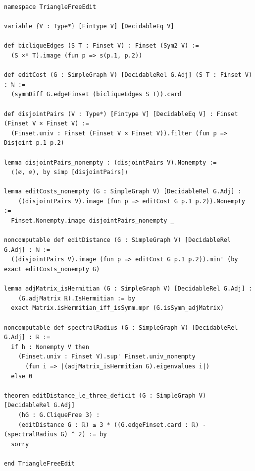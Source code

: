 \documentclass[11pt]{article}
\theoremstyle{remark}
\begin{document}
\begin{Verbatim}[fontsize=\small]
namespace TriangleFreeEdit

variable {V : Type*} [Fintype V] [DecidableEq V]

def bicliqueEdges (S T : Finset V) : Finset (Sym2 V) :=
  (S ×ˢ T).image (fun p => s(p.1, p.2))

def editCost (G : SimpleGraph V) [DecidableRel G.Adj] (S T : Finset V) : ℕ :=
  (symmDiff G.edgeFinset (bicliqueEdges S T)).card

def disjointPairs (V : Type*) [Fintype V] [DecidableEq V] : Finset (Finset V × Finset V) :=
  (Finset.univ : Finset (Finset V × Finset V)).filter (fun p => Disjoint p.1 p.2)

lemma disjointPairs_nonempty : (disjointPairs V).Nonempty :=
  ⟨(∅, ∅), by simp [disjointPairs]⟩

lemma editCosts_nonempty (G : SimpleGraph V) [DecidableRel G.Adj] :
    ((disjointPairs V).image (fun p => editCost G p.1 p.2)).Nonempty :=
  Finset.Nonempty.image disjointPairs_nonempty _

noncomputable def editDistance (G : SimpleGraph V) [DecidableRel G.Adj] : ℕ :=
  ((disjointPairs V).image (fun p => editCost G p.1 p.2)).min' (by exact editCosts_nonempty G)

lemma adjMatrix_isHermitian (G : SimpleGraph V) [DecidableRel G.Adj] :
    (G.adjMatrix ℝ).IsHermitian := by
  exact Matrix.isHermitian_iff_isSymm.mpr (G.isSymm_adjMatrix)

noncomputable def spectralRadius (G : SimpleGraph V) [DecidableRel G.Adj] : ℝ :=
  if h : Nonempty V then
    (Finset.univ : Finset V).sup' Finset.univ_nonempty
      (fun i => |(adjMatrix_isHermitian G).eigenvalues i|)
  else 0

theorem editDistance_le_three_deficit (G : SimpleGraph V) [DecidableRel G.Adj]
    (hG : G.CliqueFree 3) :
    (editDistance G : ℝ) ≤ 3 * ((G.edgeFinset.card : ℝ) - (spectralRadius G) ^ 2) := by
  sorry

end TriangleFreeEdit
\end{Verbatim}
\end{document}
